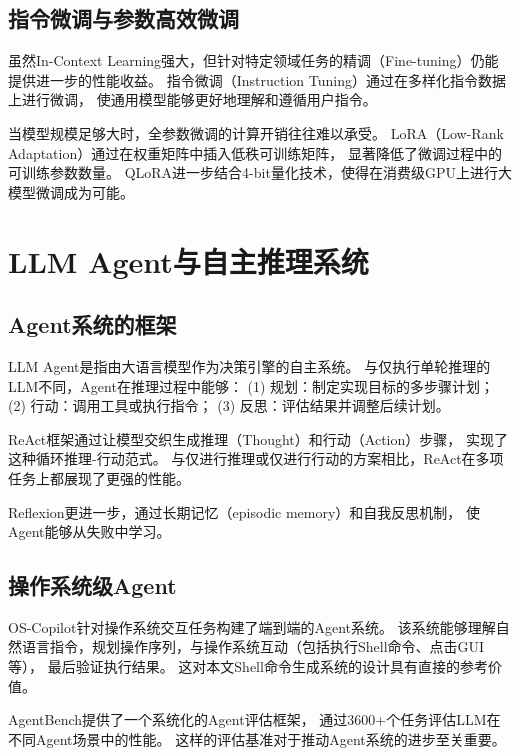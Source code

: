 \subsection{指令微调与参数高效微调}

虽然In-Context Learning强大，但针对特定领域任务的精调（Fine-tuning）仍能提供进一步的性能收益。
指令微调（Instruction Tuning）通过在多样化指令数据上进行微调，
使通用模型能够更好地理解和遵循用户指令。

当模型规模足够大时，全参数微调的计算开销往往难以承受。
LoRA（Low-Rank Adaptation）通过在权重矩阵中插入低秩可训练矩阵，
显著降低了微调过程中的可训练参数数量。
QLoRA进一步结合4-bit量化技术，使得在消费级GPU上进行大模型微调成为可能。

\section{LLM Agent与自主推理系统}

\subsection{Agent系统的框架}

LLM Agent是指由大语言模型作为决策引擎的自主系统。
与仅执行单轮推理的LLM不同，Agent在推理过程中能够：
(1) 规划：制定实现目标的多步骤计划；
(2) 行动：调用工具或执行指令；
(3) 反思：评估结果并调整后续计划。

ReAct框架通过让模型交织生成推理（Thought）和行动（Action）步骤，
实现了这种循环推理-行动范式。
与仅进行推理或仅进行行动的方案相比，ReAct在多项任务上都展现了更强的性能。

Reflexion更进一步，通过长期记忆（episodic memory）和自我反思机制，
使Agent能够从失败中学习。

\subsection{操作系统级Agent}

OS-Copilot针对操作系统交互任务构建了端到端的Agent系统。
该系统能够理解自然语言指令，规划操作序列，与操作系统互动（包括执行Shell命令、点击GUI等），
最后验证执行结果。
这对本文Shell命令生成系统的设计具有直接的参考价值。

AgentBench提供了一个系统化的Agent评估框架，
通过3600+个任务评估LLM在不同Agent场景中的性能。
这样的评估基准对于推动Agent系统的进步至关重要。

